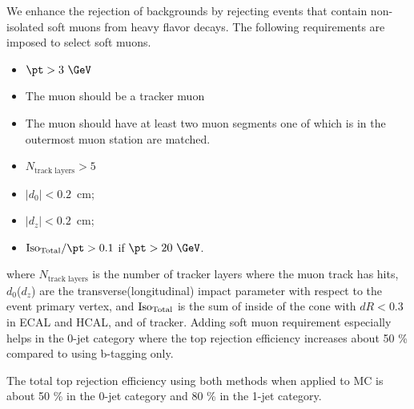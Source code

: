 We enhance the rejection of \topbkg{} backgrounds by rejecting events that contain 
non-isolated soft muons from heavy flavor decays. The following requirements are imposed to 
select soft muons. 
\begin{itemize} 
    \item $\pt > 3~\GeV$ 
    \item The muon should be a tracker muon
    \item The muon should have at least two muon segments one of which is 
          in the outermost muon station are matched.
    \item $N_{\textrm{track layers}}>5$ 
    \item $|d_{0}| < 0.2$~cm;
    \item $|d_{z}| <0.2$~cm;
    \item ${\rm{Iso}_{\textrm{Total}}}/{\pt}>0.1$ if $\pt>20~\GeV$.
\end{itemize} 
where $N_{\textrm{track layers}}$ is the number of tracker layers where the muon track has hits, 
$d_{0}$($d_{z}$) are the transverse(longitudinal) impact parameter with respect to 
the event primary vertex, and $\rm{Iso}_{\textrm{Total}}$ is the sum of \Et{} inside of the cone 
with $dR < 0.3$ in ECAL and HCAL, and \pt{} of tracker. Adding soft muon requirement 
especially helps in the 0-jet category where the top rejection efficiency increases 
about 50 \% compared to using b-tagging only.

The total top rejection efficiency using both methods when applied to \topbkg{} MC 
is about 50 \% in the 0-jet category and 80 \% in the 1-jet category. 




